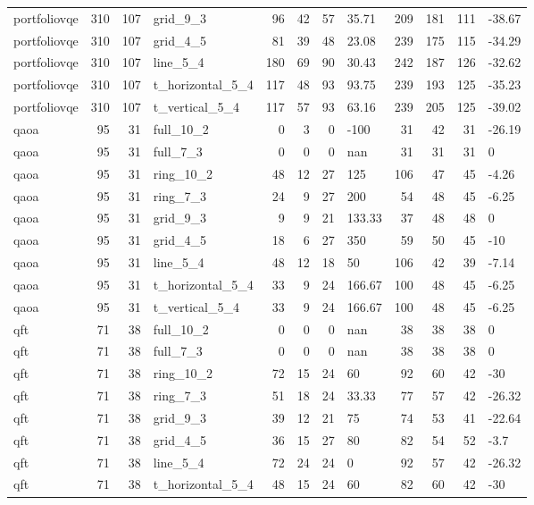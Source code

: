 \begin{longtable}{lrrlrrrlrrrl}
portfoliovqe & 310 & 107 & grid\_9\_3 & 96 & 42 & 57 & 35.71 & 209 & 181 & 111 & -38.67 \\
portfoliovqe & 310 & 107 & grid\_4\_5 & 81 & 39 & 48 & 23.08 & 239 & 175 & 115 & -34.29 \\
portfoliovqe & 310 & 107 & line\_5\_4 & 180 & 69 & 90 & 30.43 & 242 & 187 & 126 & -32.62 \\
portfoliovqe & 310 & 107 & t\_horizontal\_5\_4 & 117 & 48 & 93 & 93.75 & 239 & 193 & 125 & -35.23 \\
portfoliovqe & 310 & 107 & t\_vertical\_5\_4 & 117 & 57 & 93 & 63.16 & 239 & 205 & 125 & -39.02 \\
qaoa & 95 & 31 & full\_10\_2 & 0 & 3 & 0 & -100 & 31 & 42 & 31 & -26.19 \\
qaoa & 95 & 31 & full\_7\_3 & 0 & 0 & 0 & nan & 31 & 31 & 31 & 0 \\
qaoa & 95 & 31 & ring\_10\_2 & 48 & 12 & 27 & 125 & 106 & 47 & 45 & -4.26 \\
qaoa & 95 & 31 & ring\_7\_3 & 24 & 9 & 27 & 200 & 54 & 48 & 45 & -6.25 \\
qaoa & 95 & 31 & grid\_9\_3 & 9 & 9 & 21 & 133.33 & 37 & 48 & 48 & 0 \\
qaoa & 95 & 31 & grid\_4\_5 & 18 & 6 & 27 & 350 & 59 & 50 & 45 & -10 \\
qaoa & 95 & 31 & line\_5\_4 & 48 & 12 & 18 & 50 & 106 & 42 & 39 & -7.14 \\
qaoa & 95 & 31 & t\_horizontal\_5\_4 & 33 & 9 & 24 & 166.67 & 100 & 48 & 45 & -6.25 \\
qaoa & 95 & 31 & t\_vertical\_5\_4 & 33 & 9 & 24 & 166.67 & 100 & 48 & 45 & -6.25 \\
qft & 71 & 38 & full\_10\_2 & 0 & 0 & 0 & nan & 38 & 38 & 38 & 0 \\
qft & 71 & 38 & full\_7\_3 & 0 & 0 & 0 & nan & 38 & 38 & 38 & 0 \\
qft & 71 & 38 & ring\_10\_2 & 72 & 15 & 24 & 60 & 92 & 60 & 42 & -30 \\
qft & 71 & 38 & ring\_7\_3 & 51 & 18 & 24 & 33.33 & 77 & 57 & 42 & -26.32 \\
qft & 71 & 38 & grid\_9\_3 & 39 & 12 & 21 & 75 & 74 & 53 & 41 & -22.64 \\
qft & 71 & 38 & grid\_4\_5 & 36 & 15 & 27 & 80 & 82 & 54 & 52 & -3.7 \\
qft & 71 & 38 & line\_5\_4 & 72 & 24 & 24 & 0 & 92 & 57 & 42 & -26.32 \\
qft & 71 & 38 & t\_horizontal\_5\_4 & 48 & 15 & 24 & 60 & 82 & 60 & 42 & -30 \\

\end{longtable}
